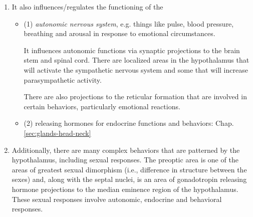 \begin{enumerate}
\begin{itemize}
\begin{enumerate}
     \item (carrying the information to SCN) exit the optic chiasm and turns
     upward, toward the SCN 
  \end{enumerate}

  \textcolor{blue}{This nucleus is responsible for our biological clock}, i.e.
  generating signals that can keep the body 24-hours schedule (circadian rhythms
  to the day-night cycle).
  \footnote{\url{http://www.hhmi.org/biointeractive/human-suprachiasmatic-nucleus}}
  However, because the internal clock's period is not exactly 24 hours,
  environmental cues - most importantly, light - are required to reset the clock
  each morning and keep the organism in sync with the external world.
  These neurons inside fires with a circadian rhythm.
  Inside a single SCN neuron, the protein product of a biological clock gene
  turns off production of more protein, forming a negative feedback loop. 
  
  \end{itemize}
  
     
  \item It also influences/regulates the functioning of the
\begin{itemize}
  \item  (1) {\it autonomic nervous system}, e.g. things like pulse, blood
  pressure, breathing and arousal in response to emotional circumstances.

It influences autonomic functions via synaptic projections to the brain stem and
spinal cord. There are localized areas in the hypothalamus that will activate
the sympathetic nervous system and some that will increase parasympathetic activity.
  
There are also projections to the reticular formation that are involved in
certain behaviors, particularly emotional reactions.
     
  \item (2) releasing hormones for endocrine functions and behaviors:
  Chap.\ref{sec:glands-head-neck}   
\end{itemize}  

   \item Additionally, there are many complex behaviors that are patterned by the
hypothalamus, including sexual responses. The preoptic area is one of the areas
of greatest sexual dimorphism (i.e., difference in structure between the sexes)
and, along with the septal nuclei, is an area of gonadotropin releasing hormone
projections to the median eminence region of the hypothalamus. These sexual
responses involve autonomic, endocrine and behavioral responses.

\end{enumerate}

